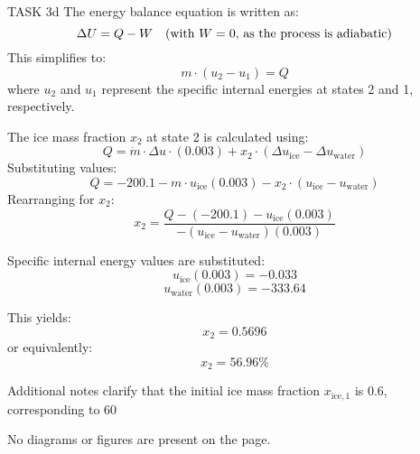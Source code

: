 TASK 3d  
The energy balance equation is written as:  
\[
\Delta U = Q - W \quad \text{(with \( W = 0 \), as the process is adiabatic)}  
\]  
This simplifies to:  
\[
m \cdot (u_2 - u_1) = Q  
\]  
where \( u_2 \) and \( u_1 \) represent the specific internal energies at states 2 and 1, respectively.  

The ice mass fraction \( x_2 \) at state 2 is calculated using:  
\[
Q = \dot{m} \cdot \Delta u \cdot (0.003) + x_2 \cdot (\Delta u_{\text{ice}} - \Delta u_{\text{water}})  
\]  
Substituting values:  
\[
Q = -200.1 - m \cdot u_{\text{ice}}(0.003) - x_2 \cdot (u_{\text{ice}} - u_{\text{water}})  
\]  
Rearranging for \( x_2 \):  
\[
x_2 = \frac{Q - (-200.1) - u_{\text{ice}}(0.003)}{- (u_{\text{ice}} - u_{\text{water}})(0.003)}  
\]  

Specific internal energy values are substituted:  
\[
u_{\text{ice}}(0.003) = -0.033  
\]  
\[
u_{\text{water}}(0.003) = -333.64  
\]  

This yields:  
\[
x_2 = 0.5696  
\]  
or equivalently:  
\[
x_2 = 56.96\%  
\]  

Additional notes clarify that the initial ice mass fraction \( x_{\text{ice},1} \) is 0.6, corresponding to 60%

No diagrams or figures are present on the page.
